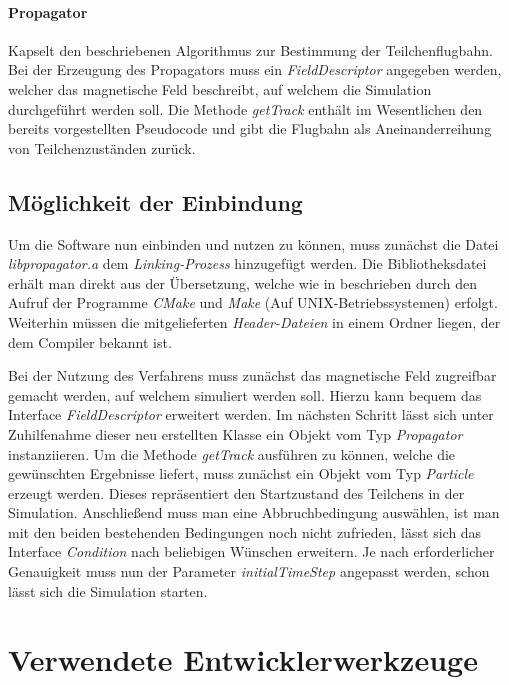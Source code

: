 \paragraph{Propagator}
Kapselt den beschriebenen Algorithmus zur Bestimmung der Teilchenflugbahn. Bei der Erzeugung des Propagators muss ein
\textit{FieldDescriptor} angegeben werden, welcher das magnetische Feld beschreibt, auf welchem die Simulation durchgef\"uhrt werden
soll. Die Methode \textit{getTrack} enth\"alt im Wesentlichen den bereits vorgestellten Pseudocode und gibt
die Flugbahn als Aneinanderreihung von Teilchenzust\"anden zur\"uck.

\subsection{M\"oglichkeit der Einbindung}

Um die Software nun einbinden und nutzen zu k\"onnen, muss zun\"achst die Datei \textit{libpropagator.a} dem \textit{Linking-Prozess}
hinzugef\"ugt werden. Die Bibliotheksdatei erh\"alt man direkt aus der \"Ubersetzung, welche wie in  beschrieben
durch den Aufruf der Programme \textit{CMake} und \textit{Make} (Auf UNIX-Betriebssystemen) erfolgt. Weiterhin m\"ussen die
mitgelieferten \textit{Header-Dateien} in einem Ordner liegen, der dem Compiler bekannt ist.

Bei der Nutzung des Verfahrens muss zun\"achst das magnetische Feld zugreifbar gemacht werden, auf welchem simuliert werden soll.
Hierzu kann bequem das Interface \textit{FieldDescriptor} erweitert werden. Im n\"achsten Schritt l\"asst sich unter Zuhilfenahme
dieser neu
erstellten Klasse ein Objekt vom Typ \textit{Propagator} instanziieren. Um die Methode \textit{getTrack} ausf\"uhren zu k\"onnen,
welche die gew\"unschten Ergebnisse liefert, muss zun\"achst ein Objekt vom Typ \textit{Particle} erzeugt werden. Dieses
repr\"asentiert den Startzustand des Teilchens in der Simulation. Anschlie{\ss}end muss man eine Abbruchbedingung ausw\"ahlen,
ist man mit den beiden bestehenden Bedingungen noch nicht zufrieden, l\"asst sich das Interface \textit{Condition} nach beliebigen
W\"unschen erweitern. Je nach erforderlicher Genauigkeit muss nun der Parameter \textit{initialTimeStep} angepasst werden, schon
l\"asst sich die Simulation starten.

\section{Verwendete Entwicklerwerkzeuge}

